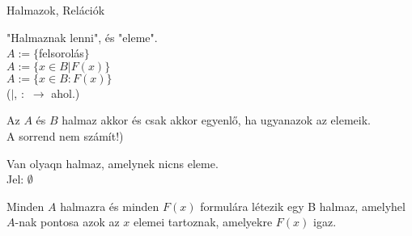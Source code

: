

\begin{frame}[plain]
\begin{tcolorbox}[center, colback={myyellow}, coltext={black}, colframe={myyellow}]
    {\Huge Halmazok, Relációk}
    \mmedskip
\end{tcolorbox}
\end{frame}

\begin{frame}
  \begin{tcolorbox}[title={Def.: A halmazelmélet "Definiálatlan alapfogalmai"}]
    "Halmaznak lenni", és "eleme".\\
    $A := \{$felsorolás$\}$\\
    $A := \{ x \in B | F(x) \}$\\
    $A := \{ x \in B : F(x) \}$\\
    {\footnotesize ($|$, $:$ $\rightarrow$ ahol.)}
  \end{tcolorbox}

  \begin{tcolorbox}[title={Def.:  Meghatározottsági Axióma (Halmazok egyenlősége)}]
    Az $A$ és $B$ halmaz akkor és csak akkor egyenlő, ha ugyanazok az elemeik.\\
    {\footnotesize A sorrend nem számít!)}
  \end{tcolorbox}

  \begin{tcolorbox}[title={Def.: Az üres halmz axiómája}]
    Van olyaqn halmaz, amelynek nicns eleme.\\
    Jel: $\emptyset$
  \end{tcolorbox}

  \begin{tcolorbox}[title={Def.: Részhalmaz-axióma}]
    Minden $A$ halmazra és minden $F(x)$ formulára létezik egy B halmaz, amelyhel $A$-nak pontosa azok az $x$ elemei tartoznak, amelyekre $F(x)$ igaz.
  \end{tcolorbox}
\end{frame}

